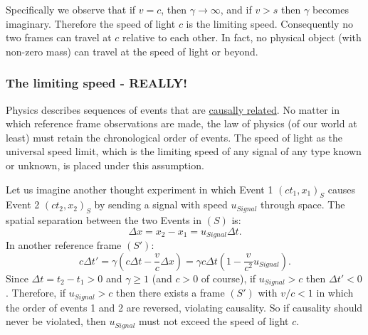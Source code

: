 \documentclass[a4paper,11pt]{article}
\numberwithin{equation}{section}
\begin{document}
 \noindent Specifically we observe that if $v=c$, then $\gamma \rightarrow \infty$, and if $v > s$ then $\gamma$ becomes imaginary. Therefore the speed of light $c$ is the limiting speed. Consequently no two frames can travel at $c$ relative to each other. In fact, no physical object (with non-zero mass) can travel at the speed of light or beyond.   
 \subsubsection{The limiting speed - REALLY!}
 Physics describes sequences of events that are \underline{causally related}. No matter in which reference frame observations are made, the law of physics (of our world at least) must retain the chronological order of events. The speed of light as the universal speed limit, which is the limiting speed of any signal of any type known or unknown, is placed under this assumption. 
 
 \noindent Let us imagine another thought experiment in which Event 1 $(ct_1,x_1)_S$ causes Event 2 $(ct_2,x_2)_S$ by sending a signal with speed $u_{Signal}$ through space. The spatial separation between the two Events in $(S)$ is:
 \begin{equation}
 \Delta x = x_2 - x_1 = u_{Signal}\Delta t. 
 \end{equation}
 In another reference frame $(S')$:
 \begin{equation}
 c\Delta t'=\gamma\left( c\Delta t - \frac{v}{c}\Delta x\right) =\gamma c\Delta t\left(1-\frac{v}{c^2}u_{Signal}\right).
 \end{equation}
 Since $\Delta t = t_2-t_1 > 0$ and $\gamma \geq 1$ (and $c>0$ of course), if $u_{Signal} > c$ then $\Delta t' < 0$. Therefore, if $u_{Signal} > c$ then there exists a frame $(S')$ with $v/c < 1$ in which the order of events 1 and 2 are reversed, violating causality. So if causality should never be violated, then $u_{Signal}$ must not exceed the speed of light $c$.
 
\end{document}
